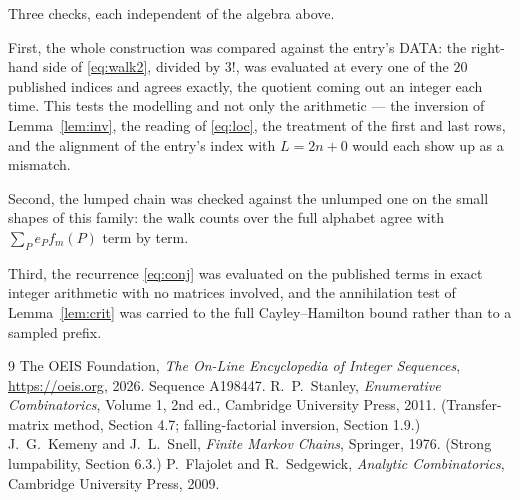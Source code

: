 \documentclass[11pt,a4paper]{article}
\theoremstyle{plain}
\theoremstyle{definition}
\begin{document}
Three checks, each independent of the algebra above.

First, the whole construction was compared against the entry's DATA: the right-hand side of
\eqref{eq:walk2}, divided by $3!$, was evaluated at every one of the $20$
published indices and agrees exactly, the quotient coming out an integer each time. This
tests the modelling and not only the arithmetic --- the inversion of Lemma~\ref{lem:inv},
the reading of \eqref{eq:loc}, the treatment of the first and last rows, and the
alignment of the entry's index with $L=2n+0$ would each show up as a mismatch.

Second, the lumped chain was checked against the unlumped one on the small shapes of this
family: the walk counts over the full alphabet agree with $\sum_P e_Pf_m(P)$ term by term.

Third, the recurrence \eqref{eq:conj} was evaluated on the published terms in exact integer
arithmetic with no matrices involved, and the annihilation test of Lemma~\ref{lem:crit} was
carried to the full Cayley--Hamilton bound rather than to a sampled prefix.

\begin{thebibliography}{9}
 The OEIS Foundation, \emph{The On-Line Encyclopedia of Integer
Sequences}, \url{https://oeis.org}, 2026. Sequence A198447.
 R.~P.~Stanley, \emph{Enumerative Combinatorics}, Volume 1, 2nd ed.,
Cambridge University Press, 2011. (Transfer-matrix method, Section 4.7; falling-factorial
inversion, Section 1.9.)
 J.~G.~Kemeny and J.~L.~Snell, \emph{Finite Markov Chains}, Springer,
1976. (Strong lumpability, Section 6.3.)
 P.~Flajolet and R.~Sedgewick, \emph{Analytic Combinatorics}, Cambridge
University Press, 2009.
\end{thebibliography}
\end{document}
